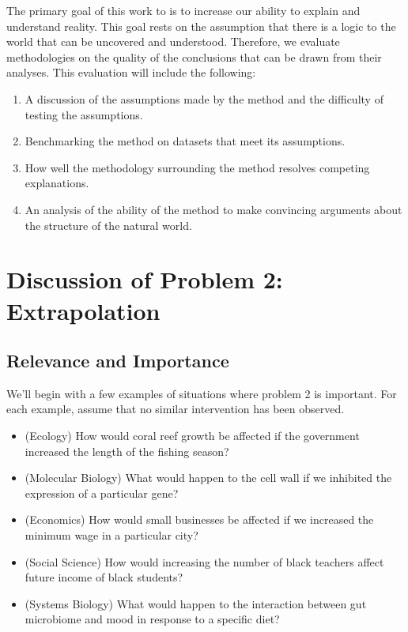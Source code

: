 \documentclass{article}
\begin{document}
        The primary goal of this work to is to increase our ability to explain and understand reality. This goal rests on the
        assumption that there is a logic to the world that can be uncovered and understood. Therefore, we evaluate methodologies
        on the quality of the conclusions that can be drawn from their analyses. This evaluation will include the following:

        \begin{enumerate}
            \item A discussion of the assumptions made by the method and the difficulty of testing the assumptions.
            \item Benchmarking the method on datasets that meet its assumptions.
            \item How well the methodology surrounding the method resolves competing explanations.
            \item An analysis of the ability of the method to make convincing arguments about the structure of the natural world.
        \end{enumerate}

\section*{Discussion of Problem 2: Extrapolation}

    \subsection*{Relevance and Importance}

        We'll begin with a few examples of situations where problem 2 is important. For each example, assume that no
        similar intervention has been observed.

        \begin{itemize}
            \item (Ecology) How would coral reef growth be affected if the government increased the length of the fishing season?
            \item (Molecular Biology) What would happen to the cell wall if we inhibited the expression of a particular gene?
            \item (Economics) How would small businesses be affected if we increased the minimum wage in a particular city?
            \item (Social Science) How would increasing the number of black teachers affect future income of black students?
            \item (Systems Biology) What would happen to the interaction between gut microbiome and mood in response to a specific diet?
        \end{itemize}
\end{document}
